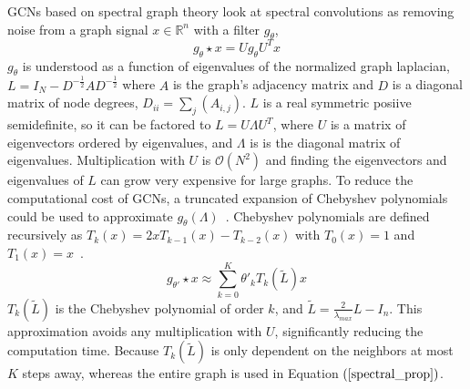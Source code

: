 GCNs based on spectral graph theory look at spectral convolutions as removing noise from a graph signal $x \in \mathbb{R}^n$ with a filter $g_\theta$,
\setcounter{equation}{0}
\begin{equation}
\label{spectral_prop}
g_\theta \star x = Ug_\theta U^Tx
\end{equation}
$g_\theta$ is understood as a function of eigenvalues of the normalized graph laplacian, $L = I_N - D^{-\frac{1}{2}}AD^{-\frac{1}{2}}$ where $A$ is the graph's adjacency matrix and $D$ is a diagonal matrix of node degrees, $D_{ii} = \sum_{j} (A_{i,j})$. $L$ is a real symmetric posiive semidefinite, so it can be factored to $L = U\Lambda U^T$, where $U$ is a matrix of eigenvectors ordered by eigenvalues, and $\Lambda$ is is the diagonal matrix of eigenvalues. Multiplication with $U$ is $\mathcal{O}(N^2) $ and finding the eigenvectors and eigenvalues of $L$ can grow very expensive for large graphs. To reduce the computational cost of GCNs, a truncated expansion of Chebyshev polynomials could be used to approximate $g_\theta (\Lambda)$~\cite{Defferrard2016}.
Chebyshev polynomials are defined recursively as $T_k(x) = 2xT_{k-1}(x) - T_{k-2}(x)$ with $T_0(x) = 1$ and $T_1(x) = x$~\cite{Hammond2011}.
\begin{equation}
\label{cheby_prop}
g_{\theta'} \star x \approx \sum\limits_{k=0}^{K} \theta'_k T_k (\tilde{L})x
\end{equation}
$T_k(\tilde{L})$ is the Chebyshev polynomial of order $k$, and $\tilde{L} = \frac{2}{\lambda_{max}} L - I_n$. This approximation avoids any multiplication with $U$, significantly reducing the computation time. Because $T_k(\tilde{L})$ is only dependent on the neighbors at most $K$ steps away, whereas the entire graph is used in Equation $(\ref{spectral_prop})$.

